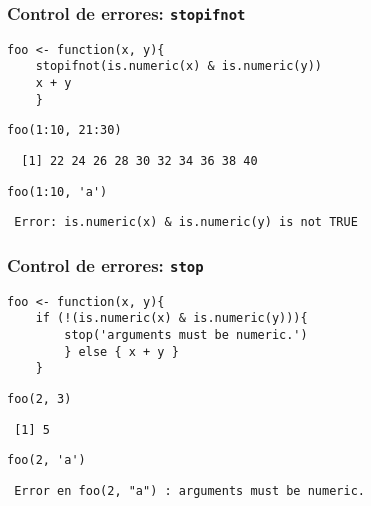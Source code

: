 \documentclass[xcolor={usenames,svgnames,dvipsnames}]{beamer}
\begin{document}
\begin{frame}[fragile]
\frametitle{Control de errores: \texttt{stopifnot}}
\label{sec-1-10}


\lstset{language=R}
\begin{lstlisting}
foo <- function(x, y){
    stopifnot(is.numeric(x) & is.numeric(y))
    x + y
    }
\end{lstlisting}



\lstset{language=R}
\begin{lstlisting}
foo(1:10, 21:30)
\end{lstlisting}

\begin{verbatim}
  [1] 22 24 26 28 30 32 34 36 38 40
\end{verbatim}


\lstset{language=R}
\begin{lstlisting}
foo(1:10, 'a')
\end{lstlisting}

\begin{verbatim}
 Error: is.numeric(x) & is.numeric(y) is not TRUE
\end{verbatim}
\end{frame}
\begin{frame}[fragile]
\frametitle{Control de errores: \texttt{stop}}
\label{sec-1-11}


\lstset{language=R}
\begin{lstlisting}
foo <- function(x, y){
    if (!(is.numeric(x) & is.numeric(y))){
        stop('arguments must be numeric.')
        } else { x + y }
    }
\end{lstlisting}



\lstset{language=R}
\begin{lstlisting}
foo(2, 3)
\end{lstlisting}

\begin{verbatim}
 [1] 5
\end{verbatim}


\lstset{language=R}
\begin{lstlisting}
foo(2, 'a')
\end{lstlisting}

\begin{verbatim}
 Error en foo(2, "a") : arguments must be numeric.
\end{verbatim}
\end{frame}
\end{document}
